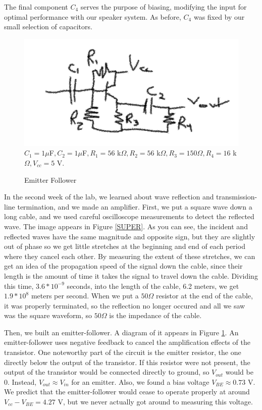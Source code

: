 \documentclass[11pt]{article}
\begin{document}
The final component $C_4$ serves the purpose of biasing, modifying the input for optimal
performance with our speaker system. As before, $C_4$ was fixed by our small selection of capacitors.
\begin{figure}
\centering
\includegraphics[scale=0.6]{ef}
$C_1 = 1 \mu$F$, C_2 = 1 \mu$F$, R_1 = 56$ k$\Omega, R_2 = 56$ k$\Omega, R_3 = 150\Omega, R_4 = 16$ k$\Omega, V_{cc} = 5$ V. 
\caption{Emitter Follower \label{EF}}
\end{figure}

In the second week of the lab, we learned about wave reflection and transmission-line termination, and we made
an amplifier. First, we put a square wave down a long cable, and we used careful oscilloscope measurements 
to detect the reflected wave. The image appears in Figure \ref{SUPER}. As you can see, the incident and reflected
waves have the same magnitude and opposite sign, but they are slightly out of phase so we get little stretches at the 
beginning and end of each period where they cancel each other. By measuring the extent of these stretches, 
we can get an idea of the propagation speed of the signal down the cable, since their length is the
amount of time it takes the signal to travel down the cable. Dividing this time, $3.6 * 10^{-9}$ seconds, into the length of
the cable, 6.2 meters, we get $1.9*10^8$ meters per second. When we put a $50\Omega$ resistor at the end of the 
cable, it was properly terminated, so the reflection no longer occured and all we saw was the square waveform, so
$50\Omega$ is the impedance of the cable. 

Then, we built an emitter-follower. A diagram of it appears in Figure \ref{EF}. An emitter-follower uses negative feedback
to cancel the amplification effects of the transistor. One noteworthy part of the circuit is the emitter resistor, 
the one directly below the output of the transistor. If this resistor were not present, the output of the transistor 
would be connected directly to ground, so $V_{out}$ would be 0. Instead, $V_{out} \approx V_{in}$ for an emitter.
Also, we found a bias voltage $V_{BE} \approx 0.73$ V. We predict that the emitter-follower would cease to operate properly
at around $V_{cc} - V_{BE} = 4.27$ V, but we never actually got around to measuring this voltage.
\end{document}
